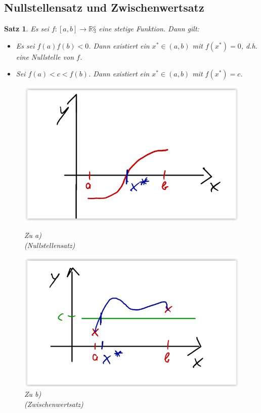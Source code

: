 \documentclass[12pt,a4paper]{article}%
\newtheorem{satz}{Satz}[section]
\numberwithin{equation}{section}
\newcommand{\R}{\mathbb{R}} %
\numberwithin{equation}{subsection}
\begin{document}
  \subsection{Nullstellensatz und Zwischenwertsatz}
  \begin{satz}
    Es sei $f: [a,b]\rightarrow \R§$ eine stetige Funktion. Dann gilt:
    \begin{itemize}
      \item[a) ] Es sei $f(a)f(b) < 0$. Dann existiert ein $x^*\in(a,b)$ mit $f(x^*) = 0$, d.h. eine Nullstelle von $f$.
      \item[b) ] Sei $f(a) < c < f(b)$. Dann existiert ein $x^* \in (a,b)$ mit $f(x^*) = c$.
    \end{itemize}
    \begin{figure}[H] 
			\centering
			\begin{minipage}{.5\textwidth}
			  \centering
			  \captionsetup{justification=centering}
			  \includegraphics[width=0.75\linewidth]{potenzreihen_nullstellensatz.png}
			  \caption{Zu a) \\ (Nullstellensatz) \protect\cite{HM12}}
			  \label{fig:reihe_potenzradius_r}
			\end{minipage}%
			\begin{minipage}{.5\textwidth}
			  \centering
			  \captionsetup{justification=centering}
			  \includegraphics[width=0.8\linewidth]{potenzreihen_zwischenwertsatz.png}
			  \caption{Zu b) \\ (Zwischenwertsatz) \protect\cite{HM12}}
			  \label{fig:reihe_potenzradius_c}
			\end{minipage}
    \end{figure}
  \end{satz}
\end{document}
